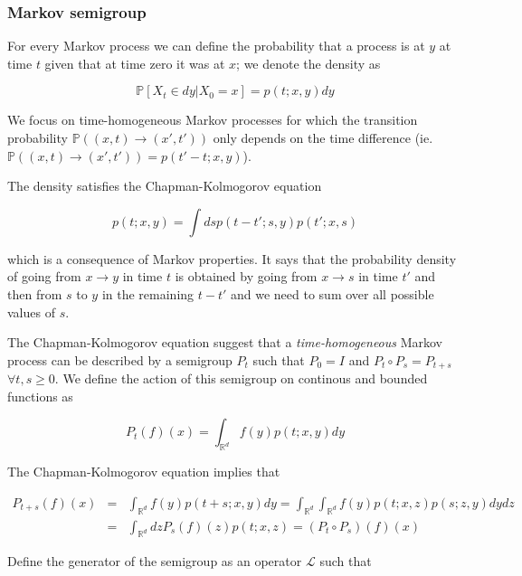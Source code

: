 \documentclass[11pt,a4paper]{article}
\begin{document}
\subsubsection{Markov semigroup}

For every Markov process we can define the probability that a process is at $y$ at time $t$ given that at time zero it was at $x$; we denote the density as

\begin{equation}
    \mathbb{P}[X_t \in dy |X_0=x] = p(t;x,y)dy
\end{equation}

We focus on time-homogeneous Markov processes for which the transition probability $\mathbb{P}((x,t)\to (x',t'))$ only depends on the time difference (ie. $\mathbb{P}((x,t)\to (x',t')) = p(t'-t;x,y)$).

The density satisfies the Chapman-Kolmogorov equation

\begin{equation}
p(t;x,y) = \int ds p(t-t';s,y)p(t';x,s)    
\end{equation}

which is a consequence of Markov properties. It says that the probability density of going from $x \to y$ in time $t$ is obtained by going from $x \to s$ in time $t'$ and then from $s$ to $y$ in the remaining $t-t'$ and we need to sum over all possible values of $s$.

The Chapman-Kolmogorov equation suggest that a \textit{time-homogeneous} Markov process can be described by a semigroup $P_t$ such that $P_0 = I$ and $P_{t} \circ P_{s} = P_{t+s}$ $\forall t,s \geq 0$. We define the action of this semigroup on continous and bounded functions as

\begin{equation}
    P_t(f)(x) = \int_{\mathbb{R}^d} f(y)p(t;x,y)dy
\end{equation}


The Chapman-Kolmogorov equation implies that

\begin{eqnarray*}
    P_{t+s}(f)(x) &=& \int_{\mathbb{R}^d} f(y)p(t+s;x,y)dy =  \int_{\mathbb{R}^d}\int_{\mathbb{R}^d} f(y)p(t;x,z)p(s;z,y)dydz\\
    &=& \int_{\mathbb{R}^d}dzP_{s}(f)(z)p(t;x,z) = (P_t \circ P_s)(f)(x)
\end{eqnarray*}

Define the generator of the semigroup as an operator $\mathcal{L}$ such that
\end{document}
